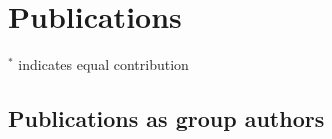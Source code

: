 \section{Publications}
$^*$ indicates equal contribution
\nocite{*}
\printbibliography[heading=none, notkeyword={covid}]
\subsection*{Publications as group authors}
\printbibliography[heading=none, keyword={covid}]